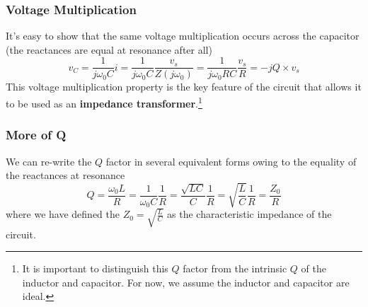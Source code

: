 \subsubsection{Voltage Multiplication}
It's easy to show that the same voltage multiplication occurs across the capacitor (the reactances are equal at resonance after all)
    \begin{equation}
        v_C = \frac{1}{j\omega_0 C} i = \frac{1}{j\omega_0 C}
        \frac{v_s}{Z(j\omega_0)} = \frac{1}{j\omega_0 R C} \frac{v_s}{R} = - j Q
        \times v_s
    \end{equation}
This voltage multiplication property is the key feature of the circuit that allows it to be used as an \textbf{impedance transformer}.\footnote{It is important to distinguish this $Q$ factor from the intrinsic $Q$ of the inductor and capacitor.  For now, we assume the inductor and capacitor are ideal.}
\subsubsection{More of Q}
We can re-write the $Q$ factor in several equivalent forms owing to the equality of the reactances at resonance
    \begin{equation} \label{eq:qdefs}
        Q = \frac{\omega_0 L}{R} = \frac{1}{\omega_0 C} \frac{1}{R} = \frac{\sqrt{LC}}{C} \frac{1}{R} = \sqrt{\frac{L}{C}} \frac{1}{R} = \frac{Z_0}{R}
    \end{equation}
where we have defined the $Z_0 = \sqrt{\tfrac{L}{C}}$ as the characteristic impedance of the circuit.
